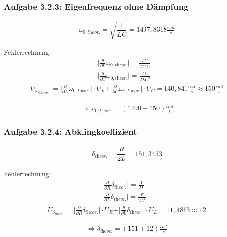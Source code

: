 \documentclass[a4paper]{scrartcl}
\numberwithin{equation}{subsection}
\begin{document}
\subsubsection{Aufgabe 3.2.3: Eigenfrequenz ohne Dämpfung}

\begin{align}
\omega_{0,\textit{theor.}} = \sqrt{\dfrac{1}{LC}}= 1497,8318 \frac{rad}{s}
\end{align}

Fehlerrechnung:
\begin{align*}
\vert \frac{\partial}{\partial L}\omega_{0,\textit{theor.}}\vert = \frac{LC}{2L^2C} &\\
\vert \frac{\partial}{\partial C}\omega_{0,\textit{theor.}}\vert = \frac{LC}{2LC^2} &
\end{align*}
\begin{align*}
U_{\omega_{0,\textit{theor.}}} = \vert \frac{\partial}{\partial L}\omega_{0,\textit{theor.}}\vert \cdot U_L + \vert \frac{\partial}{\partial C}\omega_{0,\textit{theor.}}\vert \cdot U_C = 140,841 \frac{rad}{s} \approx 150 \frac{rad}{s}
\end{align*}

\begin{align*}
\Rightarrow \omega_{0,\textit{theor.}} = (1490 \mp 150) \frac{rad}{s}
\end{align*}

\subsubsection{Aufgabe 3.2.4: Abklingkoeffizient}

\begin{align}
\delta_{\textit{theor.}} = \dfrac{R}{2L}= 151,3453
\end{align}

Fehlerrechnung:
\begin{align*}
\vert \frac{\partial}{\partial R}\delta_{\textit{theor.}}\vert = \frac{1}{2L} &\\
\vert \frac{\partial}{\partial L}\delta_{\textit{theor.}}\vert = \frac{R}{2L^2} &
\end{align*}
\begin{align*}
U_{\delta_{\textit{theor.}}} = \vert \frac{\partial}{\partial R}\delta_{\textit{theor.}}\vert \cdot U_R + \vert \frac{\partial}{\partial L}\delta_{\textit{theor.}}\vert \cdot U_L = 11,4863 \approx 12 
\end{align*}

\begin{align*}
\Rightarrow \delta_{\textit{theor.}} = (151 \mp 12) \frac{rad}{s}
\end{align*}
\end{document}
